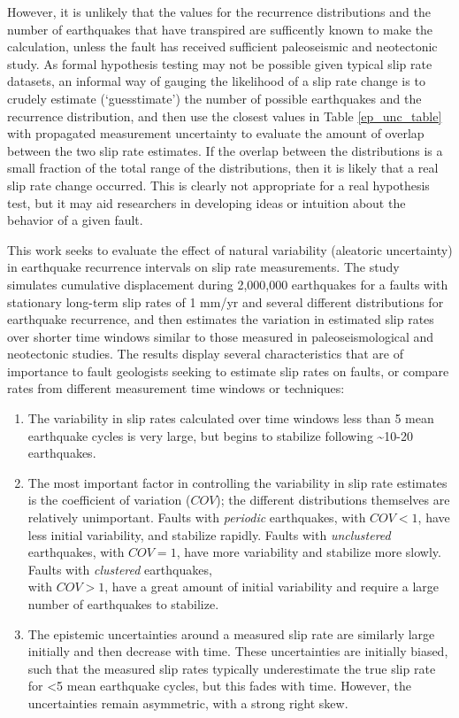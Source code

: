 \documentclass[se, manuscript]{copernicus}
\begin{document}
However, it is unlikely that the values for the recurrence distributions
and the number of earthquakes that have transpired are sufficently known
to make the calculation, unless the fault has received sufficient
paleoseismic and neotectonic study. As formal hypothesis testing may not
be possible given typical slip rate datasets, an informal way of gauging
the likelihood of a slip rate change is to crudely estimate
(`guesstimate') the number of possible earthquakes and the recurrence
distribution, and then use the closest values in Table
\ref{ep_unc_table} with propagated measurement uncertainty to evaluate
the amount of overlap between the two slip rate estimates. If the
overlap between the distributions is a small fraction of the total range
of the distributions, then it is likely that a real slip rate change
occurred. This is clearly not appropriate for a real hypothesis test,
but it may aid researchers in developing ideas or intuition about the
behavior of a given fault.

\conclusions

This work seeks to evaluate the effect of natural variability (aleatoric
uncertainty) in earthquake recurrence intervals on slip rate
measurements. The study simulates cumulative displacement during
2,000,000 earthquakes for a faults with stationary long-term slip rates
of 1 mm/yr and several different distributions for earthquake
recurrence, and then estimates the variation in estimated slip rates
over shorter time windows similar to those measured in
paleoseismological and neotectonic studies. The results display several
characteristics that are of importance to fault geologists seeking to
estimate slip rates on faults, or compare rates from different
measurement time windows or techniques:

\begin{enumerate}
\def\labelenumi{\arabic{enumi}.}
\item
  The variability in slip rates calculated over time windows less than 5
  mean earthquake cycles is very large, but begins to stabilize
  following \textasciitilde{}10-20 earthquakes.
\item
  The most important factor in controlling the variability in slip rate
  estimates is the coefficient of variation (\(COV\)); the different
  distributions themselves are relatively unimportant. Faults with
  \emph{periodic} earthquakes, with \(COV < 1\), have less initial
  variability, and stabilize rapidly. Faults with \emph{unclustered}
  earthquakes, with \(COV = 1\), have more variability and stabilize
  more slowly. Faults with \emph{clustered} earthquakes,\\
  with \(COV > 1\), have a great amount of initial variability and
  require a large number of earthquakes to stabilize.
\item
  The epistemic uncertainties around a measured slip rate are similarly
  large initially and then decrease with time. These uncertainties are
  initially biased, such that the measured slip rates typically
  underestimate the true slip rate for \textless{}5 mean earthquake
  cycles, but this fades with time. However, the uncertainties remain
  asymmetric, with a strong right skew.
\end{enumerate}
\end{document}
